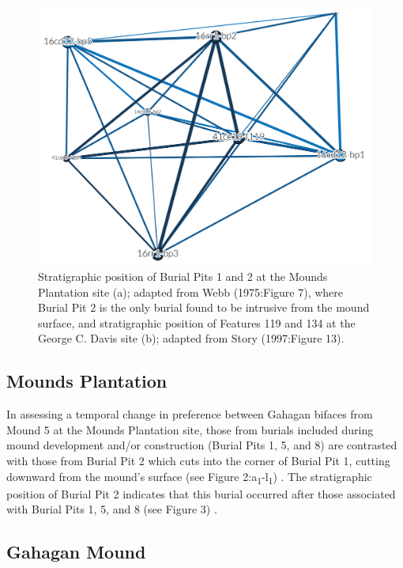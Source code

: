 \documentclass[]{interact}
\theoremstyle{plain}%
\theoremstyle{definition}
\theoremstyle{remark}
\begin{document}
\begin{figure}

{\centering \includegraphics[width=0.8\linewidth]{img/fig03} 

}

\caption{Stratigraphic position of Burial Pits 1 and 2 at the Mounds Plantation site (a); adapted from Webb (1975:Figure 7), where Burial Pit 2 is the only burial found to be intrusive from the mound surface, and stratigraphic position of Features 119 and 134 at the George C. Davis site (b); adapted from Story (1997:Figure 13).}\label{fig:h1a}
\end{figure}

\hypertarget{mounds-plantation}{%
\subsection{Mounds Plantation}\label{mounds-plantation}}

In assessing a temporal change in preference between Gahagan bifaces
from Mound 5 at the Mounds Plantation site, those from burials included
during mound development and/or construction (Burial Pits 1, 5, and 8)
are contrasted with those from Burial Pit 2 which cuts into the corner
of Burial Pit 1, cutting downward from the mound's surface (see Figure
2:a\textsubscript{1}-l\textsubscript{1}) \citep{RN8174}. The
stratigraphic position of Burial Pit 2 indicates that this burial
occurred after those associated with Burial Pits 1, 5, and 8 (see Figure
3) \citep{RN8174}.

\hypertarget{gahagan-mound}{%
\subsection{Gahagan Mound}\label{gahagan-mound}}
\end{document}

